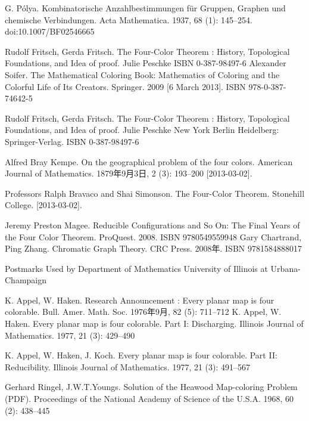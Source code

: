 \documentclass[12pt]{article} %
\begin{document}
\begin{thebibliography}{9}


G. Pólya. Kombinatorische Anzahlbestimmungen für Gruppen, Graphen und chemische Verbindungen. Acta Mathematica. 1937, 68 (1): 145–254. doi:10.1007/BF02546665








  Rudolf Fritsch, Gerda Fritsch. The Four-Color Theorem : History, Topological Foundations, and Idea of proof. Julie Peschke  ISBN 0-387-98497-6
  Alexander Soifer. The Mathematical Coloring Book: Mathematics of Coloring and the Colorful Life of Its Creators. Springer. 2009 [6 March 2013]. ISBN 978-0-387-74642-5 

Rudolf Fritsch, Gerda Fritsch. The Four-Color Theorem : History, Topological Foundations, and Idea of proof. Julie Peschke  New York Berlin Heidelberg: Springer-Verlag. ISBN 0-387-98497-6 

Alfred Bray Kempe. On the geographical problem of the four colors. American Journal of Mathematics. 1879年9月3日, 2 (3): 193–200 [2013-03-02].

Professors Ralph Bravaco and Shai Simonson. The Four-Color Theorem. Stonehill College. [2013-03-02].

Jeremy Preston Magee. Reducible Configurations and So On: The Final Years of the Four Color Theorem. ProQuest. 2008. ISBN 9780549559948 
Gary Chartrand, Ping Zhang. Chromatic Graph Theory. CRC Press. 2008年. ISBN 9781584888017 


Postmarks Used by Department of Mathematics University of Illinois at Urbana-Champaign 

K. Appel, W. Haken. Research Announcement : Every planar map is four colorable. Bull. Amer. Math. Soc. 1976年9月, 82 (5): 711–712
K. Appel, W. Haken. Every planar map is four colorable. Part I: Discharging. Illinois Journal of Mathematics. 1977, 21 (3): 429–490 

K. Appel, W. Haken, J. Koch. Every planar map is four colorable. Part II: Reducibility. Illinois Journal of Mathematics. 1977, 21 (3): 491–567

Gerhard Ringel, J.W.T.Youngs. Solution of the Heawood Map-coloring Problem (PDF). Proceedings of the National Academy of Science of the U.S.A. 1968, 60 (2): 438–445






\end{thebibliography}
\end{document}
